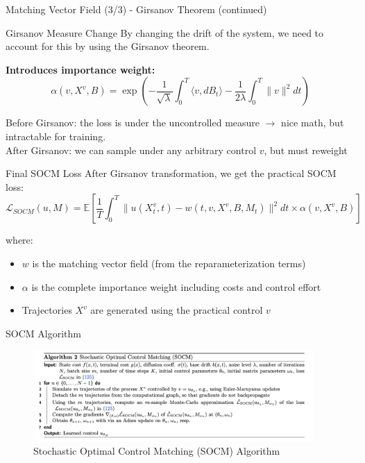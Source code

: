 \documentclass[aspectratio=169,xcolor=dvipsnames]{beamer}
\begin{document}
\begin{frame}[allowframebreaks]{Matching Vector Field (3/3) - Girsanov Theorem (continued)}

    
    \begin{alertblock}{Girsanov Measure Change}
        By changing the drift of the system, we need to account for this by using the Girsanov theorem.
        
        \textbf{Introduces importance weight:}\\ 
        $$\alpha(v, X^v, B) = \exp\left(-\frac{1}{\sqrt{\lambda}}\int_0^T \langle v, dB_t\rangle - \frac{1}{2\lambda}\int_0^T \|v\|^2 dt\right)$$
        
    Before Girsanov: the loss is under the uncontrolled measure $\rightarrow$ nice math, but intractable for training. \\
        \vspace{0.2cm}
    After Girsanov: we can sample under any arbitrary control $v$, but must reweight
    \end{alertblock}
    
    \vspace{0.5cm}
    
    \begin{alertblock}{Final SOCM Loss}
        After Girsanov transformation, we get the practical SOCM loss:
        \begin{equation}
        \mathcal{L}_{SOCM}(u, M) = \mathbb{E}\left[\frac{1}{T}\int_0^T \|u(X^v_t,t) - w(t, v, X^v, B, M_t)\|^2 dt \times \alpha(v, X^v, B)\right]
        \end{equation}
        
        where:
        \begin{itemize}
            \item $w$ is the matching vector field (from the reparameterization terms)
            \item $\alpha$ is the complete importance weight including costs and control effort
            \item Trajectories $X^v$ are generated using the practical control $v$
        \end{itemize}
    \end{alertblock}

\end{frame}

\begin{frame}{SOCM Algorithm}
    \begin{figure}
        \centering
        \includegraphics[width=0.95\textwidth]{figures/SOCM_algo.png}
        \caption{Stochastic Optimal Control Matching (SOCM) Algorithm}
    \end{figure}
\end{frame}
\end{document}
